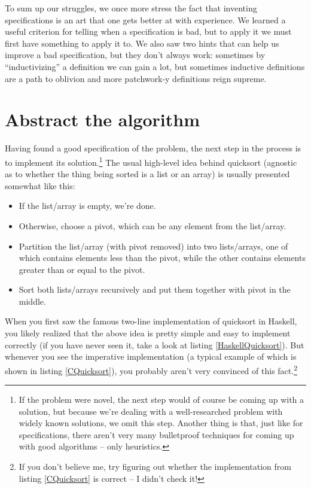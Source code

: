 \documentclass[declaration,mgr,english,shortabstract]{iithesis}
\begin{document}
To sum up our struggles, we once more stress the fact that inventing specifications is an art that one gets better at with experience. We learned a useful criterion for telling when a specification is bad, but to apply it we must first have something to apply it to. We also saw two hints that can help us improve a bad specification, but they don't always work: sometimes by ``inductivizing'' a definition we can gain a lot, but sometimes inductive definitions are a path to oblivion and more patchwork-y definitions reign supreme.

\section{Abstract the algorithm} \label{template}

Having found a good specification of the problem, the next step in the process is to implement its solution.\footnote{If the problem were novel, the next step would of course be coming up with a solution, but because we're dealing with a well-researched problem with widely known solutions, we omit this step. Another thing is that, just like for specifications, there aren't very many bulletproof techniques for coming up with good algorithms -- only heuristics.} The usual high-level idea behind quicksort (agnostic as to whether the thing being sorted is a list or an array) is usually presented somewhat like this:

\begin{itemize}
    \item If the list/array is empty, we're done.
    \item Otherwise, choose a pivot, which can be any element from the list/array.
    \item Partition the list/array (with pivot removed) into two lists/arrays, one of which contains elements less than the pivot, while the other contains elements greater than or equal to the pivot.
    \item Sort both lists/arrays recursively and put them together with pivot in the middle.
\end{itemize}

When you first saw the famous two-line implementation of quicksort in Haskell, you likely realized that the above idea is pretty simple and easy to implement correctly (if you have never seen it, take a look at listing \ref{HaskellQuicksort}). But whenever you see the imperative implementation (a typical example of which is shown in listing \ref{CQuicksort}), you probably aren't very convinced of this fact.\footnote{If you don't believe me, try figuring out whether the implementation from listing \ref{CQuicksort} is correct -- I didn't check it!}
\end{document}
